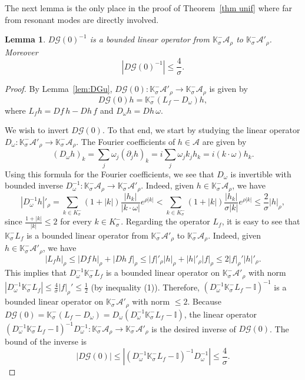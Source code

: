 \documentclass[12pt,reqno,a4paper]{amsart}%
\numberwithin{equation}{section}
\newtheorem{lemma}[theorem]{Lemma}
\newcommand{\A}{{\mathcal A}}
\newcommand{\GG}{{\mathcal G}}
\newcommand{\Ii}{{\mathbb{I}}}
\newcommand{\Kk}{{\mathbb{K}}}
\begin{document}
The next lemma is the only place in the proof of Theorem~\ref{thm unif} where far from resonant modes are directly involved.   

\begin{lemma}\label{lem:DF0} $D\GG(0)^{-1}$ is a bounded linear operator from $\Kk^-_\sigma\A_{\rho}$ to $\Kk^-_\sigma\A'_{\rho}$. Moreover 
$$
|D\GG(0)^{-1}|\leq \frac4\sigma.
$$
\end{lemma}

\begin{proof}
By Lemma~\ref{lem:DGu}, $D\GG(0)\colon\Kk^-_\sigma\A'_{\rho}\to \Kk^-_\sigma\A_{\rho}$ is given by
$$
D\GG(0)h=\Kk^-_\sigma(L_f-D_{\omega})h,
$$
where $L_fh=Df\,h-Dh\,f$ and $D_{\omega} h=Dh\,\omega$. 

We wish to invert $D\GG(0)$. To that end, we start by studying the linear operator $D_{\omega}\colon\Kk^-_{\sigma}\A'_{\rho}\to \Kk^-_{\sigma}\A_{\rho}$.  The Fourier coefficients
of $h\in \A$ are given by
$$
(D_\omega h)_k = \sum_j \omega_j (\partial_j h)_k  = i \sum_j \omega_j  k_j h_k = i (k\cdot\omega) h_k.
$$
Using this formula for the Fourier coefficients, we see that $D_\omega$ is invertible with bounded inverse $D_\omega^{-1}\colon \Kk^-_\sigma\A_{\rho}\to \Kk^-_\sigma\A'_{\rho}$. Indeed, given $h\in \Kk^-_\sigma\A_{\rho}$,  we have
$$
|D_\omega^{-1} h|'_{\rho}= \sum_{k\in K^-_\sigma}(1+|k|)\frac{|h_k|}{|k\cdot\omega|}e^{\rho|k|}
< \sum_{k\in K^-_\sigma}(1+|k|)\frac{|h_k|}{\sigma|k|}e^{\rho|k|}
\leq \frac2\sigma|h|_{\rho},
$$
since $\frac{1+|k|}{|k|}\leq 2$ for every $k\in K^-_\sigma$.
Regarding the operator $L_f$, it is easy to see that $\Kk^-_\sigma L_f$ is a bounded linear operator from $\Kk^-_\sigma\A'_{\rho}$  to $\Kk^-_\sigma\A_{\rho}$. Indeed, given $h\in \Kk^-_\sigma\A'_{\rho}$, we have
$$
|L_f h|_{\rho}\leq |Df\,h|_{\rho}+|Dh\,f|_{\rho}\leq |f|'_{\rho}|h|_{\rho}+|h|'_{\rho}|f|_{\rho}\leq 2|f|_{\rho}'|h|'_{\rho}.
$$
This implies that $D_\omega^{-1} \Kk^-_\sigma L_f$ is a bounded linear operator on $\Kk^-_\sigma\A'_{\rho}$ with norm $|D_\omega^{-1} \Kk^-_\sigma L_f|\leq \frac4\sigma|f|_{\rho}'\leq \frac12$ (by inequality (1)). 
Therefore, $(D_\omega^{-1} \Kk^-_\sigma L_f - \Ii)^{-1}$ is a bounded linear operator on $\Kk^-_\sigma\A'_{\rho}$ with norm $\leq 2$. 
Because $D\GG(0)=\Kk^-_\sigma(L_f-D_{\omega}) = D_\omega(D_\omega^{-1} \Kk^-_\sigma L_f - \Ii)$, the linear operator $(D_\omega^{-1} \Kk^-_\sigma L_f - \Ii)^{-1}D_\omega^{-1}\colon \Kk^-_\sigma\A_{\rho}\to \Kk^-_\sigma\A'_{\rho}$ is the desired inverse of $D\GG(0)$. The bound of the inverse is 
$$
|D\GG(0)|\leq  |(D_\omega^{-1}\Kk^-_\sigma L_f - \Ii)^{-1}D_\omega^{-1}|\leq \frac4\sigma.
$$
\end{proof}
\end{document}
